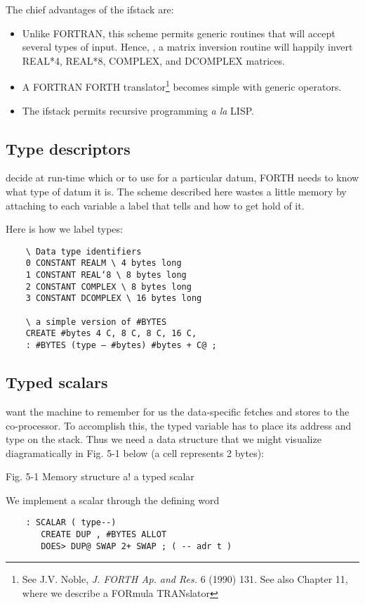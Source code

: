 The chief advantages of the ifstack are:
\begin{itemize}
    \item Unlike FORTRAN, this scheme permits generic routines that will accept several types of input. Hence, \eg, a matrix inversion routine will happily invert REAL*4, REAL*8, COMPLEX, and DCOMPLEX matrices.
    \item A FORTRAN \rightarrow FORTH translator\footnote{See J.V. Noble, \textit{J. FORTH Ap. and Res.} 6 (1990) 131. See also Chapter 11, where we describe a FORmula TRANslator} becomes simple with generic operators.
    \item The ifstack permits recursive programming \textit{a la} LISP.
\end{itemize}

\subsection{Type descriptors}
 decide at run-time which  or \regc{!} to use for a particular datum, FORTH needs to know what type of datum it is. The scheme described here wastes a little memory by attaching to each variable a label that tells  and  how to get hold of it.

Here is how we label types:
\begin{lstlisting}
    \ Data type identifiers
    0 CONSTANT REALM \ 4 bytes long
    1 CONSTANT REAL‘8 \ 8 bytes long
    2 CONSTANT COMPLEX \ 8 bytes long
    3 CONSTANT DCOMPLEX \ 16 bytes long

    \ a simple version of #BYTES
    CREATE #bytes 4 C, 8 C, 8 C, 16 C,
    : #BYTES (type — #bytes) #bytes + C@ ;
\end{lstlisting}

\subsection{Typed scalars}

 want the machine to remember for us the data-specific fetches and stores to the co-processor. To accomplish this, the typed variable has to place its address and type on the stack. Thus we need a data structure that we might visualize diagramatically in Fig. 5-1 below (a cell  represents 2 bytes):

Fig. 5-1 Memory structure a! a typed scalar

We implement a scalar through the defining word

\begin{lstlisting}
    : SCALAR ( type--)
       CREATE DUP , #BYTES ALLOT
       DOES> DUP@ SWAP 2+ SWAP ; ( -- adr t )
\end{lstlisting}

